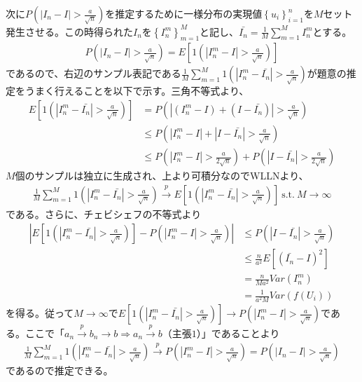 \documentclass{article}
\begin{document}
次に$P\left( | I_n - I | > \frac{a}{\sqrt{n}} \right)$を推定するために一様分布の実現値$\left\{ u_i \right\}_{i=1}^n$を$M$セット発生させる。この時得られた$I_n$を$\left\{I_n^m\right\}_{m=1}^M$と記し、$\bar{I_n} = \frac{1}{M} \sum_{m=1}^M I_n^m$とする。
\begin{align*}
	P\left( | I_n - I | > \frac{a}{\sqrt{n}} \right) = E\left[ 1\left(  | I_n^m - I | > \frac{a}{\sqrt{n}} \right) \right]
\end{align*}
であるので、右辺のサンプル表記である$\frac{1}{M} \sum_{m=1}^M 1\left(  | I_n^m - \bar{I_n} | > \frac{a}{\sqrt{n}} \right)$が題意の推定をうまく行えることを以下で示す。三角不等式より、
\begin{align*}
	E\left[ 1\left(  | I_n^m - \bar{I_n} | > \frac{a}{\sqrt{n}} \right) \right] &= P\left( | (I_n^m - I) + (I - \bar{I_n}) |  > \frac{a}{\sqrt{n}} \right) \\
	&\leq P\left( | I_n^m - I |+ |I - \bar{I_n}|  > \frac{a}{\sqrt{n}} \right)\\
	& \leq P\left( | I_n^m - I |> \frac{a}{2\sqrt{n}} \right) + P\left( |I - \bar{I_n}|  > \frac{a}{2\sqrt{n}} \right)
\end{align*}
$M$個のサンプルは独立に生成され、上より可積分なのでWLLNより、
\begin{align*}
\frac{1}{M} \sum_{m=1}^M 1\left(  | I_n^m - \bar{I_n} | > \frac{a}{\sqrt{n}} \right) \xrightarrow{p} E\left[ 1\left(  | I_n^m - \bar{I_n} | > \frac{a}{\sqrt{n}} \right) \right]\ \text{s.t.}\ M\to \infty
\end{align*}
である。さらに、チェビシェフの不等式より
\begin{align*}
	\left| E\left[ 1\left(  | I_n^m - \bar{I_n} | > \frac{a}{\sqrt{n}} \right) \right] - P\left( | I_n^m - I |> \frac{a}{\sqrt{n}} \right)  \right| &\leq P\left( |I - \bar{I_n}|  > \frac{a}{\sqrt{n}} \right)\\
	&\leq \frac{n}{a^2} E\left[ \left( \bar{I_n} - I \right)^2 \right]\\
	&= \frac{n}{Ma^2} Var\left(I_n^m \right)\\
	&= \frac{1}{a^2M} Var\left( f(U_i) \right)
\end{align*}
を得る。従って$M\to \infty$で$E\left[ 1\left(  | I_n^m - \bar{I_n} | > \frac{a}{\sqrt{n}} \right) \right] \to P\left( | I_n^m - I |> \frac{a}{\sqrt{n}} \right)$である。ここで「$a_n \xrightarrow{p} b_n \to b \Rightarrow a_n \xrightarrow{p} b$（主張$1$）」であることより
\begin{align*}
	\frac{1}{M} \sum_{m=1}^M 1\left(  | I_n^m - \bar{I_n} | > \frac{a}{\sqrt{n}} \right) \xrightarrow{p} P\left( | I_n^m - I |> \frac{a}{\sqrt{n}} \right) = P\left( | I_n - I |> \frac{a}{\sqrt{n}} \right)
\end{align*}
であるので推定できる。
\end{document}
